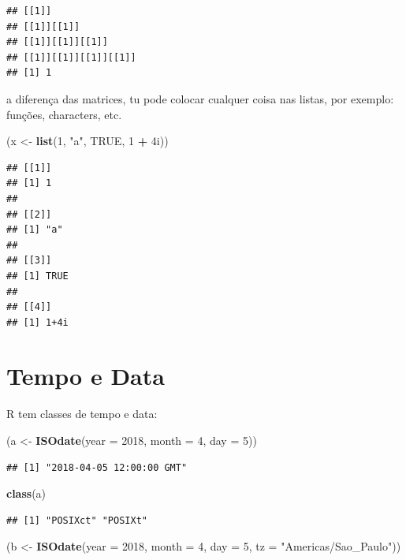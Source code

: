 \documentclass[]{book}
\newenvironment{Shaded}{\begin{snugshade}}{\end{snugshade}}
\newcommand{\KeywordTok}[1]{\textcolor[rgb]{0.13,0.29,0.53}{\textbf{#1}}}
\newcommand{\DataTypeTok}[1]{\textcolor[rgb]{0.13,0.29,0.53}{#1}}
\newcommand{\DecValTok}[1]{\textcolor[rgb]{0.00,0.00,0.81}{#1}}
\newcommand{\StringTok}[1]{\textcolor[rgb]{0.31,0.60,0.02}{#1}}
\newcommand{\OtherTok}[1]{\textcolor[rgb]{0.56,0.35,0.01}{#1}}
\newcommand{\OperatorTok}[1]{\textcolor[rgb]{0.81,0.36,0.00}{\textbf{#1}}}
\newcommand{\NormalTok}[1]{#1}
\begin{document}
\begin{verbatim}
## [[1]]
## [[1]][[1]]
## [[1]][[1]][[1]]
## [[1]][[1]][[1]][[1]]
## [1] 1
\end{verbatim}

a diferença das matrices, tu pode colocar cualquer coisa nas listas, por
exemplo: funções, characters, etc.

\begin{Shaded}
\begin{Highlighting}[]
\NormalTok{(x <-}\StringTok{ }\KeywordTok{list}\NormalTok{(}\DecValTok{1}\NormalTok{, }\StringTok{"a"}\NormalTok{, }\OtherTok{TRUE}\NormalTok{, }\DecValTok{1} \OperatorTok{+}\StringTok{ }\NormalTok{4i))}
\end{Highlighting}
\end{Shaded}

\begin{verbatim}
## [[1]]
## [1] 1
## 
## [[2]]
## [1] "a"
## 
## [[3]]
## [1] TRUE
## 
## [[4]]
## [1] 1+4i
\end{verbatim}

\section{Tempo e Data}\label{tempo-e-data}

R tem classes de tempo e data:

\begin{Shaded}
\begin{Highlighting}[]
\NormalTok{(a <-}\StringTok{ }\KeywordTok{ISOdate}\NormalTok{(}\DataTypeTok{year =} \DecValTok{2018}\NormalTok{, }\DataTypeTok{month =} \DecValTok{4}\NormalTok{, }\DataTypeTok{day =} \DecValTok{5}\NormalTok{))}
\end{Highlighting}
\end{Shaded}

\begin{verbatim}
## [1] "2018-04-05 12:00:00 GMT"
\end{verbatim}

\begin{Shaded}
\begin{Highlighting}[]
\KeywordTok{class}\NormalTok{(a)}
\end{Highlighting}
\end{Shaded}

\begin{verbatim}
## [1] "POSIXct" "POSIXt"
\end{verbatim}

\begin{Shaded}
\begin{Highlighting}[]
\NormalTok{(b <-}\StringTok{ }\KeywordTok{ISOdate}\NormalTok{(}\DataTypeTok{year =} \DecValTok{2018}\NormalTok{, }\DataTypeTok{month =} \DecValTok{4}\NormalTok{, }\DataTypeTok{day =} \DecValTok{5}\NormalTok{, }\DataTypeTok{tz =} \StringTok{"Americas/Sao_Paulo"}\NormalTok{))}
\end{Highlighting}
\end{Shaded}
\end{document}
